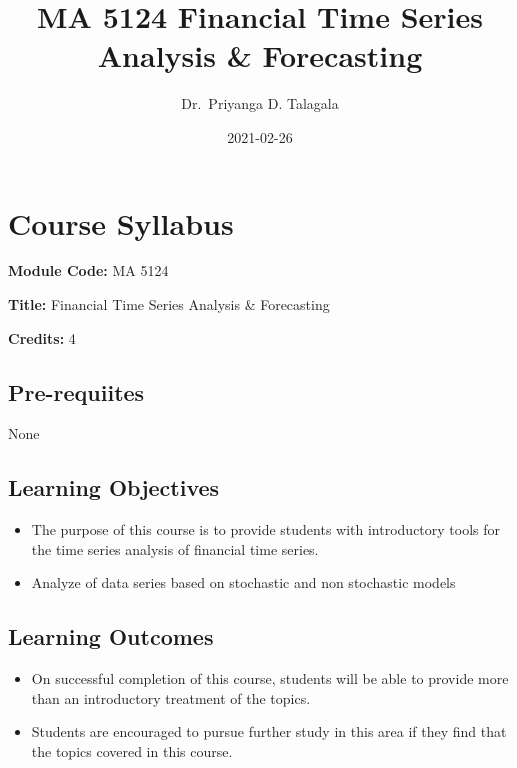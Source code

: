\documentclass[]{book}
\title{MA 5124 Financial Time Series Analysis \& Forecasting}
\author{Dr.~Priyanga D. Talagala}
\date{2021-02-26}
\providecommand{\tightlist}{%
  \setlength{\itemsep}{0pt}\setlength{\parskip}{0pt}}
\begin{document}
\maketitle

{
\setcounter{tocdepth}{1}
\tableofcontents
}
\hypertarget{course-syllabus}{%
\chapter*{Course Syllabus}\label{course-syllabus}}


\textbf{Module Code:} MA 5124

\textbf{Title:} Financial Time Series Analysis \& Forecasting

\textbf{Credits:} 4

\hypertarget{pre-requiites}{%
\section*{Pre-requiites}\label{pre-requiites}}

None

\hypertarget{learning-objectives}{%
\section*{Learning Objectives}\label{learning-objectives}}

\begin{itemize}
\tightlist
\item
  The purpose of this course is to provide students with introductory tools for the time series analysis of financial time series.
\item
  Analyze of data series based on stochastic and non stochastic models
\end{itemize}

\hypertarget{learning-outcomes}{%
\section*{Learning Outcomes}\label{learning-outcomes}}

\begin{itemize}
\tightlist
\item
  On successful completion of this course, students will be able to provide more than an introductory treatment of the topics.
\item
  Students are encouraged to pursue further study in this area if they find that the topics covered in this course.
\end{itemize}
\end{document}
